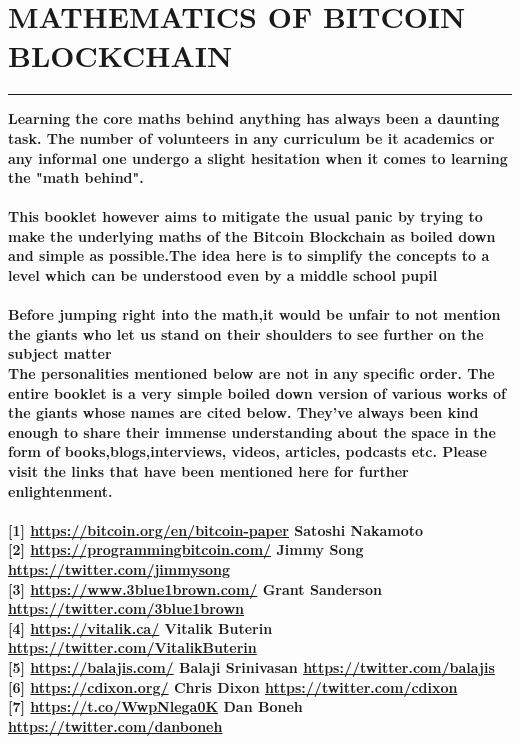 \documentclass{article}
\begin{document}
\section*{ MATHEMATICS OF BITCOIN BLOCKCHAIN }
\hrule
\bigskip

\textbf{Learning the core maths behind anything has always been a daunting task. The number of volunteers in any curriculum be it academics or any informal one undergo a slight hesitation  when it comes to learning the "math behind".}
\\
\\
\textbf{This booklet however aims to mitigate the usual panic  by trying to make the underlying  maths of the Bitcoin Blockchain  as boiled down and simple  as possible.The idea here is to simplify the concepts to a level which can be understood even by a middle school pupil}
\\
\\
\textbf{Before jumping right into the math,it would be unfair to not  mention  the giants who let us stand on their shoulders to see further on the subject matter}
\\
\textbf{ The personalities mentioned below are not in any specific order. The entire booklet is a very simple boiled down version of various works of the giants whose names are cited below. They've always been kind enough to share their immense understanding about the space   in the form of books,blogs,interviews, videos, articles, podcasts etc. Please visit the links that have been mentioned here for further enlightenment. }
\\
\\
\textbf{[1] \url{https://bitcoin.org/en/bitcoin-paper} Satoshi Nakamoto }
\\
\textbf{[2] \url{https://programmingbitcoin.com/} Jimmy Song \quad \url{https://twitter.com/jimmysong}}
\\
\textbf{[3] \url{https://www.3blue1brown.com/} Grant Sanderson \quad \url{https://twitter.com/3blue1brown}}
\\
\textbf{[4] \url{https://vitalik.ca/} Vitalik Buterin \quad 
 \url{https://twitter.com/VitalikButerin}}
\\
\textbf{[5] \url {https://balajis.com/} Balaji Srinivasan \quad  \url{https://twitter.com/balajis}}
\\
\textbf{[6] \url{https://cdixon.org/} Chris Dixon \quad
    \url{https://twitter.com/cdixon}}
\\
\textbf{[7] \url{https://t.co/WwpNlega0K}  Dan Boneh \quad 
\url{https://twitter.com/danboneh} }
\end{document}
